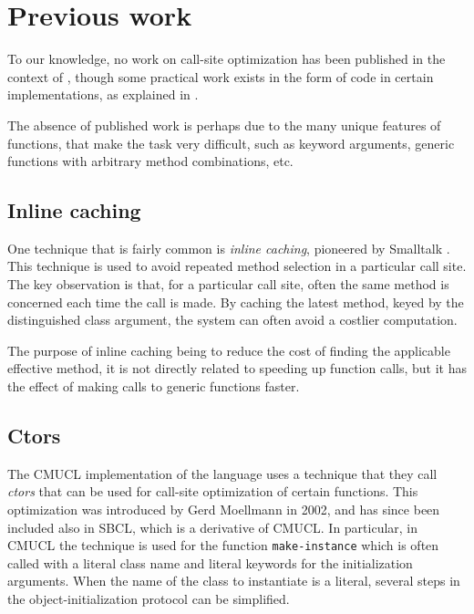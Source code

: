 \section{Previous work}

To our knowledge, no work on call-site optimization has been published
in the context of \commonlisp{}, though some practical work exists in
the form of code in certain implementations, as explained in
.

The absence of published work is perhaps due to the many unique
features of \commonlisp{} functions, that make the task very
difficult, such as keyword arguments, generic functions with arbitrary
method combinations, etc.

\subsection{Inline caching}

One technique that is fairly common is \emph{inline caching},
pioneered by Smalltalk \cite{Deutsch:1984:ES}.  This technique is used
to avoid repeated method selection in a particular call site.  The key
observation is that, for a particular call site, often the same method
is concerned each time the call is made.  By caching the latest
method, keyed by the distinguished class argument, the system can
often avoid a costlier computation.

The purpose of inline caching being to reduce the cost of finding the
applicable effective method, it is not directly related to speeding up
function calls, but it has the effect of making calls to generic
functions faster.

\subsection{Ctors}
\label{sec-previous-ctors}

The CMUCL implementation of the \commonlisp{} language uses a
technique that they call \emph{ctors} that can be used for call-site
optimization of certain functions.  This optimization was introduced
by Gerd Moellmann in 2002, and has since been included also in SBCL,
which is a derivative of CMUCL.  In particular, in CMUCL the technique
is used for the function \texttt{make-instance} which is often called
with a literal class name and literal keywords for the initialization
arguments.  When the name of the class to instantiate is a literal,
several steps in the object-initialization protocol can be simplified.

